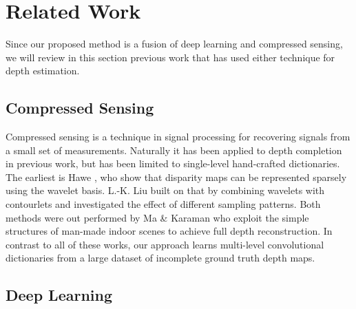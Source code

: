 \section{Related Work}
\label{sec:related-work}

Since our proposed method is a fusion of deep learning and compressed sensing, we will review in this section previous work that has used either technique for depth estimation.

\subsection{Compressed Sensing}
\label{sec:compressed-sensing}


Compressed sensing is a technique in signal processing for recovering signals from a small set of measurements. Naturally it has been applied to depth completion in previous work, but has been limited to single-level hand-crafted dictionaries. The earliest is Hawe \etal\cite{hawe2011dense}, who show that disparity maps can be represented sparsely using the wavelet basis. L.-K. Liu \etal\cite{liu2015depth} built on that by combining wavelets with contourlets and investigated the effect of different sampling patterns. Both methods were out performed by Ma \& Karaman\cite{ma2016sparse} who exploit the simple structures of man-made indoor scenes to achieve full depth reconstruction. In contrast to all of these works, our approach learns multi-level convolutional dictionaries from a large dataset of incomplete ground truth depth maps.

\subsection{Deep Learning}
\label{sec:depth-upsampling}

